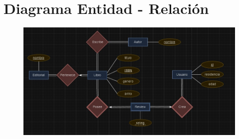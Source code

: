 \section{Diagrama Entidad - Relación}

\begin{figure}
    \centering
    \includegraphics[width=1\linewidth]{img/DiagramaER.jpeg}
    \label{fig:1}
\end{figure}